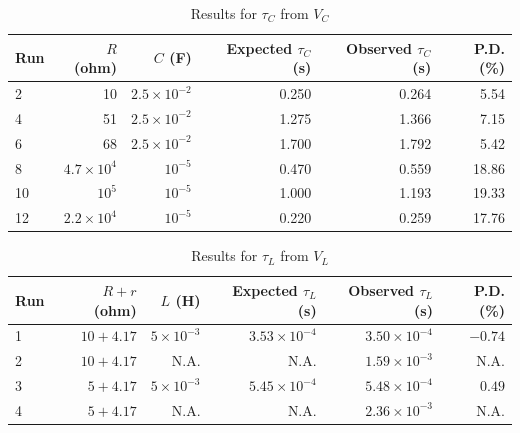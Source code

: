 \begin{table}[ht]
    \centering
    \begin{tabular}{|l|r|r|r|r|r|}
        \hline
        Run & $R$ (ohm) & $C$ (F) & Expected $\tau_{C}$ (s) & Observed $\tau_{C}$ (s) & P.D. (\%) \\
        \hline
        2 & 10 & $2.5 \times 10^{-2}$ & 0.250 & 0.264 & 5.54 \\
        4 & 51 & $2.5 \times 10^{-2}$ & 1.275 & 1.366 & 7.15 \\
        6 & 68 & $2.5 \times 10^{-2}$ & 1.700 & 1.792 & 5.42 \\
        8 & $4.7 \times 10^{4}$ & $10^{-5}$ & 0.470 & 0.559 & 18.86 \\
        10 & $10^{5}$ & $10^{-5}$ & 1.000 & 1.193 & 19.33 \\
        12 & $2.2 \times 10^{4}$ & $10^{-5}$ & 0.220 & 0.259 & 17.76 \\
        \hline
    \end{tabular}
    \caption{Results for $\tau_{C}$ from $V_{C}$}
    \label{table.05.results.tauC.VC}
\end{table}
\begin{table}[ht]
    \centering
    \begin{tabular}{|l|r|r|r|r|r|}
        \hline
        Run & $R + r$ (ohm) & $L$ (H) & Expected $\tau_{L}$ (s) & Observed $\tau_{L}$ (s) & P.D. (\%) \\
        \hline
        1 & $10 + 4.17$ & $5 \times 10^{-3}$ & $3.53 \times 10^{-4}$ & $3.50 \times 10^{-4}$ & $-0.74$ \\
        2 & $10 + 4.17$ & N.A. & N.A. & $1.59 \times 10^{-3}$ & N.A. \\
        3 & $5 + 4.17$ & $5 \times 10^{-3}$ & $5.45 \times 10^{-4}$ & $5.48 \times 10^{-4}$ & $0.49$ \\
        4 & $5 + 4.17$ & N.A. & N.A. & $2.36 \times 10^{-3}$ & N.A. \\
        \hline
    \end{tabular}
    \caption{Results for $\tau_{L}$ from $V_{L}$}
    \label{table.05.results.tauL.VL}
\end{table}
\newpage
